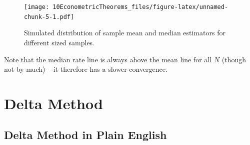 \documentclass[
]{book}
\newenvironment{Shaded}{\begin{snugshade}}{\end{snugshade}}
\newcommand{\DataTypeTok}[1]{\textcolor[rgb]{0.13,0.29,0.53}{#1}}
\newcommand{\DecValTok}[1]{\textcolor[rgb]{0.00,0.00,0.81}{#1}}
\newcommand{\FloatTok}[1]{\textcolor[rgb]{0.00,0.00,0.81}{#1}}
\newcommand{\KeywordTok}[1]{\textcolor[rgb]{0.13,0.29,0.53}{\textbf{#1}}}
\newcommand{\NormalTok}[1]{#1}
\newcommand{\OperatorTok}[1]{\textcolor[rgb]{0.81,0.36,0.00}{\textbf{#1}}}
\newcommand{\StringTok}[1]{\textcolor[rgb]{0.31,0.60,0.02}{#1}}
\begin{document}
\begin{Shaded}
\end{Shaded}

\begin{figure}
\centering
\texttt{[image: 10EconometricTheorems\_files/figure-latex/unnamed-chunk-5-1.pdf]}
\caption{\label{fig:unnamed-chunk-5}Simulated distribution of sample mean and median estimators for different sized samples.}
\end{figure}

Note that the median rate line is always above the mean line for all \(N\) (though not by much) -- it therefore has a slower convergence.

\hypertarget{dm}{%
\chapter{Delta Method}\label{dm}}

\hypertarget{delta-method-in-plain-english}{%
\section{Delta Method in Plain English}\label{delta-method-in-plain-english}}
\end{document}
